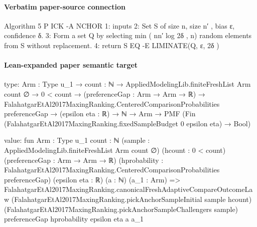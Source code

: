 \documentclass[10pt]{article}
\begin{document}
\paragraph{Verbatim paper-source connection}
\begin{ReviewVerbatim}
Algorithm 5 P ICK -A NCHOR
 1: inputs
 2:   Set S of size n, size n′ , bias ε, confidence δ.
 3: Form a set Q by selecting min ( nn′ log 2δ , n) random elements from S without replacement.
 4: return S EQ -E LIMINATE(Q, ε, 2δ )
\end{ReviewVerbatim}



\paragraph{Lean-expanded paper semantic target}
\begin{ReviewVerbatim}
type:
{Arm : Type u_1} →
  {count : ℕ} →
    AppliedModelingLib.finiteFreshList Arm count ∅ →
      0 < count →
        (preferenceGap : Arm → Arm → ℝ) →
          FalahatgarEtAl2017MaxingRanking.CenteredComparisonProbabilities preferenceGap →
            (epsilon eta : ℝ) →
              ℕ → Arm → PMF (Fin (FalahatgarEtAl2017MaxingRanking.fixedSampleBudget 0 epsilon eta) → Bool)

value:
fun {Arm : Type u_1} {count : ℕ} (sample : AppliedModelingLib.finiteFreshList Arm count ∅) (hcount : 0 < count)
    (preferenceGap : Arm → Arm → ℝ)
    (hprobability : FalahatgarEtAl2017MaxingRanking.CenteredComparisonProbabilities preferenceGap) (epsilon eta : ℝ)
    (a : ℕ) (a_1 : Arm) =>
  FalahatgarEtAl2017MaxingRanking.canonicalFreshAdaptiveCompareOutcomeLaw
    (FalahatgarEtAl2017MaxingRanking.pickAnchorSampleInitial sample hcount)
    (FalahatgarEtAl2017MaxingRanking.pickAnchorSampleChallengers sample) preferenceGap hprobability epsilon eta a a_1
\end{ReviewVerbatim}
\end{document}
